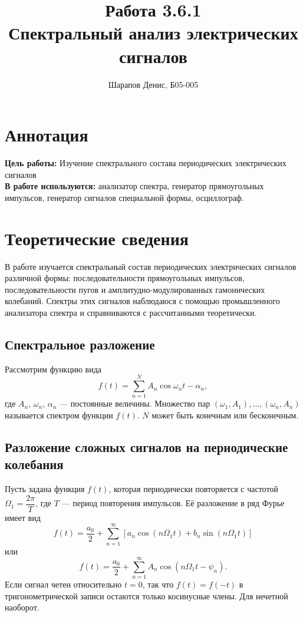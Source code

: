 \documentclass[a4paper]{article}
\title{Работа 3.6.1 \\ Спектральный анализ электрических сигналов}
\author{Шарапов Денис, Б05-005}
\date{}
\theoremstyle{definition}
\theoremstyle{remark}
\begin{document}
    \maketitle
    \tableofcontents
    \newpage
    
\section{Аннотация}

 \textbf{Цель работы:} Изучение спектрального состава периодических электрических сигналов \\
 
 \noindent \textbf{В работе используются:} анализатор спектра, генератор прямоугольных импульсов, генератор сигналов специальной формы, осциллограф.
 
 \section{Теоретические сведения}
 
В работе изучается спектральный состав периодических электрических сигналов различной формы: последовательности прямоугольных импульсов, последовательности пугов и амплитудно-модулированных гамонических колебаний. Спектры этих сигналов наблюдаюся с помощью промышленного анализатора спектра и справниваются с рассчитанными теоретически.

 \subsection{Спектральное разложение}

 Рассмотрим функцию вида $$f(t) = \sum\limits^{N}_{n=1}A_n\cos{\omega_n t - \alpha_n},$$ где $A_n$, $\omega_n$, $\alpha_n$ --- постоянные величины. Множество пар $(\omega_1, A_1), \ldots, (\omega_n, A_n)$ называется спектром функции $f(t)$. $N$ может быть конечным или бесконечным.

\subsection{Разложение сложных сигналов на периодические колебания}

Пусть задана функция $f(t)$, которая периодически повторяется с частотой $\Omega_1 = \dfrac{2\pi}{T}$, где $T$ --- период повторения импульсов. Её разложение в ряд Фурье имеет вид 
\begin{equation}
f(t) = \dfrac{a_0}{2} + \sum\limits_{n = 1}^{\infty}\left[a_n \cos \left(n \Omega_1t\right) + b_n \sin \left(n \Omega_1t\right)\right]
\end{equation}
или
\begin{equation}
f(t) = \dfrac{a_0}{2} + \sum\limits_{n = 1}^{\infty}A_n \cos \left(n\Omega_1t-\psi_n\right).
\end{equation}
Если сигнал четен относительно $t=0$, так что $f(t) = f(-t)$ в тригонометрической записи остаются только косинусные члены. Для нечетной наоборот.
\end{document}
